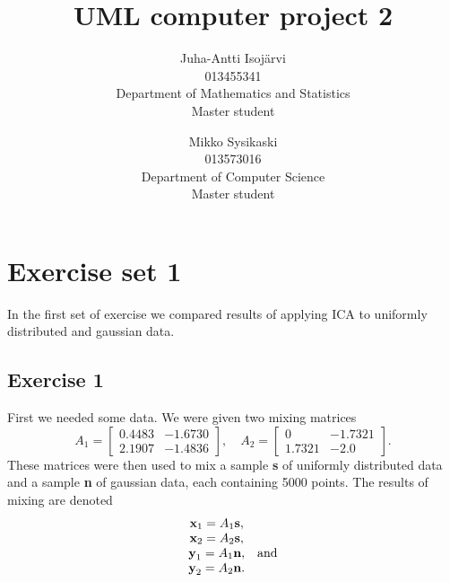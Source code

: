 \documentclass{article}
\begin{document}
\title{UML computer project 2}
\author{
Juha-Antti Isojärvi\\
013455341 \\
Department of Mathematics and Statistics\\
Master student
\and
Mikko Sysikaski\\
013573016\\
Department of Computer Science\\
Master student}
\date{}
\maketitle

\section{Exercise set 1}
In the first set of exercise we compared results of applying ICA to
uniformly distributed and gaussian data.
\subsection{Exercise 1}
First we needed some data. We were given two mixing matrices 
\[
A_1 = \left[ \begin{array}{ccc}
0.4483 & -1.6730  \\
2.1907 & -1.4836  \end{array} \right], \quad
A_2 = \left[ \begin{array}{ccc}
0 & -1.7321  \\
1.7321 & -2.0  \end{array} \right].
\]
These matrices were then used to mix a sample \textbf{s} of uniformly distributed
data and a sample \textbf{n} of gaussian data, each containing 5000
points. The results of mixing are denoted 
\[
\begin{array}{ccc}
\textbf{x}_1 = A_1\textbf{s}, \\
\textbf{x}_2 = A_2\textbf{s}, \\
\textbf{y}_1 = A_1\textbf{n}, & \textup{and} \\
\textbf{y}_2 = A_2\textbf{n}.
\end{array}
\]
\end{document}
